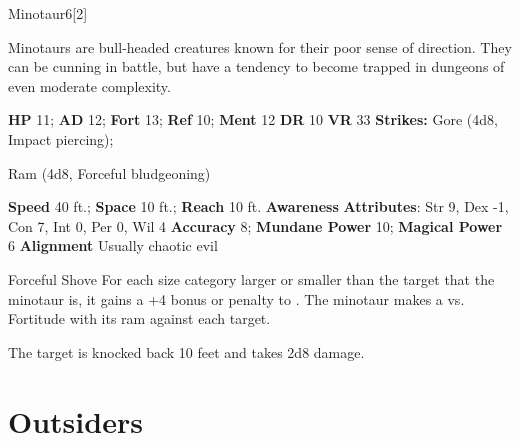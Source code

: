   \begin{monsection}{Minotaur}{6}[2]
    \vspace{-1em}\vspace{-1em}
    \vspace{0em}

    
      Minotaurs are bull-headed creatures known for their poor sense of direction.
      They can be cunning in battle, but have a tendency to become trapped in dungeons of even moderate complexity.
    
    

    \begin{spellcontent}
      \begin{spelltargetinginfo}
        \pari \textbf{HP} 11;
          \textbf{AD} 12;
          \textbf{Fort} 13;
          \textbf{Ref} 10;
          \textbf{Ment} 12
        \pari \textbf{DR} 10
        \pari \textbf{VR} 33
        \pari \textbf{Strikes:}
            Gore  (4d8, Impact piercing);
\par Ram  (4d8, Forceful bludgeoning)
      \end{spelltargetinginfo}
    \end{spellcontent}
    \begin{monsterfooter}
      \pari \textbf{Speed} 40 ft.;
        \textbf{Space} 10 ft.;
        \textbf{Reach} 10 ft.
      \pari \textbf{Awareness} 
      \pari \textbf{Attributes}:
        Str 9, Dex -1,
        Con 7, Int 0,
        Per 0, Wil 4
      \pari \textbf{Accuracy} 8;
        \textbf{Mundane Power} 10;
      \textbf{Magical Power} 6
      \pari \textbf{Alignment} Usually chaotic evil
    \end{monsterfooter}
  \end{monsection}
  \begin{freeability}{Forceful Shove}
      For each size category larger or smaller than the target that the minotaur is, it gains a +4 bonus or penalty to . The minotaur makes a 
         vs. Fortitude
        with its ram against each target.
    
    \hit The target is knocked back 10 feet and takes 2d8  damage.
    \end{freeability}
  
        \section{Outsiders}
      
